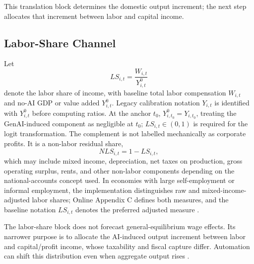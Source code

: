 \documentclass[11pt,a4paper]{article}
\begin{document}
This translation block determines the domestic output increment; the next step allocates that increment between labor and capital income.

\subsection{Labor-Share Channel}\label{sec:labor_share}

Let
\begin{equation}
    LS_{i,t}=\frac{W_{i,t}}{Y^0_{i,t}}
\end{equation}
denote the labor share of income, with baseline total labor compensation $W_{i,t}$ and no-AI GDP or value added $Y^0_{i,t}$. Legacy calibration notation $Y_{i,t}$ is identified with $Y^0_{i,t}$ before computing ratios. At the anchor $t_0$, $Y^0_{i,t_0}=Y_{i,t_0}$, treating the GenAI-induced component as negligible at $t_0$; $LS_{i,t}\in(0,1)$ is required for the logit transformation.
The complement is not labelled mechanically as corporate profits. It is a non-labor residual share,
\begin{equation}
    NLS_{i,t}=1-LS_{i,t},
\end{equation}
which may include mixed income, depreciation, net taxes on production, gross operating surplus, rents, and other non-labor components depending on the national-accounts concept used. In economies with large self-employment or informal employment, the implementation distinguishes raw and mixed-income-adjusted labor shares; Online Appendix C defines both measures, and the baseline notation $LS_{i,t}$ denotes the preferred adjusted measure \citep{gollin2002getting}.

The labor-share block does not forecast general-equilibrium wage effects. Its narrower purpose is to allocate the AI-induced output increment between labor and capital/profit income, whose taxability and fiscal capture differ. Automation can shift this distribution even when aggregate output rises \citep{acemoglu2018race,acemoglu2019automation,karabarbounis2014global}.
\end{document}
